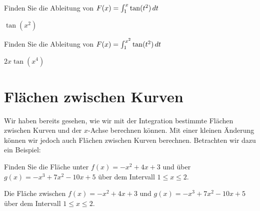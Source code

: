 \begin{exercises}
\begin{exercise} Finden Sie die Ableitung von $F(x)=\int_1^x \tan(t^2)\, d t$
\begin{answer} $\tan(x^2)$
\end{answer}\end{exercise}

\begin{exercise} Finden Sie die Ableitung von $F(x)=\int_1^{x^2} \tan(t^2)\, d t$
\begin{answer} $2x\tan(x^4)$
\end{answer}\end{exercise}

\end{exercises}













\section{Flächen zwischen Kurven}

Wir haben bereits gesehen, wie wir mit der Integration bestimmte Flächen zwischen Kurven und der $x$-Achse berechnen können. Mit einer kleinen Änderung können wir jedoch auch Flächen zwischen Kurven berechnen. Betrachten wir dazu ein Beispiel:

\begin{example} Finden Sie die Fläche unter $f(x)= -x^2+4x+3$ und über
$g(x)=-x^3+7x^2-10x+5$ über dem Intervall $1\le x\le2$. 
\end{example}

\begin{marginfigure}
\caption{Die Fläche zwischen $f(x)= -x^2+4x+3$ und
$g(x)=-x^3+7x^2-10x+5$ über dem Intervall $1\le x\le2$. }
\label{fig:area between curves}
\end{marginfigure}

